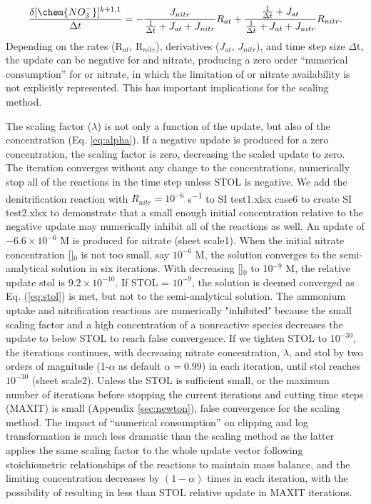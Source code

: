 \documentclass[gmd, manuscript]{copernicus}
\begin{document}
\begin{equation}
\frac{\delta [\chem{NO_3^-}]^{k+1,1}}{\Delta t}
= -\frac{J_{nitr}}{\frac{1}{\Delta t} + J_{at} + J_{nitr}} R_{at} +
\frac{\frac{1}{\Delta t} + J_{at} }{\frac{1}{\Delta t} + J_{at} + J_{nitr}}
R_{nitr}.
\end{equation}
Depending on the rates
(R$_{at}$, R$_{nitr}$), derivatives ($J_{at}$, $J_{nitr}$), and time step size
$\Delta$t, the update can be negative for  and nitrate, producing
a zero order ``numerical consumption'' for  or nitrate, in which
the limitation of  or nitrate availability is not explicitly
represented. This has important implications for the scaling method.

The scaling factor ($\lambda$) is not only a function of the update, but also
of the  concentration (Eq. \ref{eq:alpha}). If a negative update is produced
for a zero concentration, the scaling factor is zero, decreasing the scaled
update to zero. The iteration converges without any change to the
concentrations, numerically stop all of the reactions in the time step unless
STOL is negative. We add  the denitrification reaction with $R_{nitr} =
10^{-6}$ \unit{s^{-1}} to SI test1.xlsx case6 to create SI test2.xlsx to
demonstrate that a small enough initial concentration relative to the negative
update may numerically inhibit all of the reactions as well.
An update of $-6.6 \times 10^{-6}$ \unit{M} is produced for nitrate
(sheet scale1). When the initial nitrate concentration []$_0$
is not too small, say $10^{-6}$ \unit{M}, the solution converges to the semi-analytical
solution in six iterations. With decreasing []$_0$ to 10$^{-9}$
\unit{M}, the relative update stol is $9.2\times 10^{-10}$. If STOL =
$10^{-9}$, the solution is deemed converged as Eq. (\ref{eq:stol}) is met, but
not to the semi-analytical solution. The ammonium uptake and nitrification
reactions are numerically "inhibited" because the small scaling factor and a
high concentration of a nonreactive species decreases the update to
below STOL to reach false convergence. If we tighten STOL to $10^{-30}$, the
iterations continues, with decreasing nitrate concentration, $\lambda$, and
stol by two orders of magnitude (1-$\alpha$ as default $\alpha=0.99$) in each
iteration, until stol reaches $10^{-30}$ (sheet scale2). Unless the STOL is
sufficient small, or the maximum number of iterations before stopping the
current iterations and cutting time steps (MAXIT) is small (Appendix
\ref{sec:newton}), false convergence for the scaling method. The impact of
``numerical consumption'' on clipping and log transformation is much less
dramatic than the scaling method as the latter applies the same scaling factor
to the whole update vector following stoichiometric relationships of the
reactions to maintain mass balance, and the limiting concentration decreases by
$(1-\alpha)$ times in each iteration, with the possibility of resulting in less
than STOL relative update in MAXIT iterations.  
\end{document}
